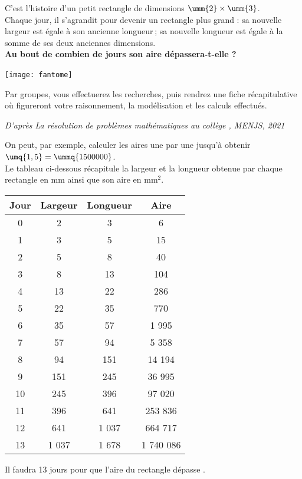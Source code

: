 \begin{enigme}

\medskip

C’est l’histoire d’un petit rectangle de dimensions $\umm{2}\times\umm{3}$. \\
   Chaque jour, il s’agrandit pour devenir un rectangle plus grand : sa nouvelle largeur est égale à son ancienne longueur ; sa nouvelle longueur est égale à la somme de ses deux anciennes dimensions. \\
   
   {\bf Au bout de combien de jours son aire dépassera-t-elle  ?} \\

   \begin{center}
      \texttt{[image: fantome]}   
   \end{center}
   
   Par groupes, vous effectuerez les recherches, puis rendrez une fiche récapitulative où figureront votre raisonnement, la modélisation et les calculs effectués.
     
\end{enigme}

\vfill \hfill {\it\small D'après \og La résolution de problèmes mathématiques au collège \fg, MENJS, 2021}

\begin{corrige}
   On peut, par exemple, calculer les aires une par une jusqu'à obtenir $\umq{1,5} = \ummq{1500000}$. \\
   Le tableau ci-dessous récapitule la largeur et la longueur obtenue par chaque rectangle en mm ainsi que son aire en mm$^2$. \medskip
   
   \begin{tabular}{|c|c|c|c|}
      \hline
      Jour & Largeur & Longueur & Aire \\
      \hline
      0 & 2 & 3 & 6 \\
      \hline
      1 & 3 & 5 & 15 \\
      \hline
      2 & 5 & 8 & 40 \\
      \hline
      3 & 8 & 13 & 104 \\
      \hline
      4 & 13 & 22 & 286 \\
      \hline
      5 & 22 & 35 & 770 \\
      \hline
      6 & 35 & 57 & 1 995 \\
      \hline
      7 & 57 & 94 & 5 358 \\
      \hline
      8 & 94 & 151 & 14 194 \\
      \hline
      9 & 151 & 245 & 36 995 \\
      \hline
      10 & 245 & 396 & 97 020 \\
      \hline
      11 & 396 & 641 & 253 836 \\
      \hline
      12 & 641 & 1 037 & 664 717 \\
      \hline
      13 & 1 037 & 1 678 & 1 740 086 \\
      \hline
   \end{tabular}
   \medskip
   
   {\blue Il faudra 13 jours pour que l'aire du rectangle dépasse .}
\end{corrige}
      
